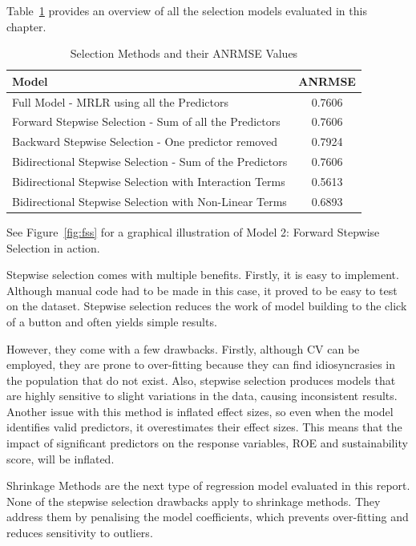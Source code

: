 \documentclass[11pt]{report} %
\begin{document}
\noindent Table~\ref{tab:model_anrmse} provides an overview of all the selection models evaluated in this chapter.
\renewcommand{\arraystretch}{1.1} %
\begin{table}[H]
    \centering
    \begin{tabular}{|l|c|}
        \hline
        \textbf{Model} & \textbf{ANRMSE} \\
        \hline
        Full Model - MRLR using all the Predictors & 0.7606  \\
        Forward Stepwise Selection - Sum of all the Predictors & 0.7606 \\
        Backward Stepwise Selection - One predictor removed & 0.7924 \\
        Bidirectional Stepwise Selection - Sum of the Predictors & 0.7606 \\
        Bidirectional Stepwise Selection with Interaction Terms & 0.5613 \\
        Bidirectional Stepwise Selection with Non-Linear Terms & 0.6893 \\
        \hline
    \end{tabular}
    \caption{Selection Methods and their ANRMSE Values}
    \label{tab:model_anrmse}
\end{table}
\noindent See Figure~\ref{fig:fss} for a graphical illustration of Model 2: Forward Stepwise Selection in action.

Stepwise selection comes with multiple benefits. Firstly, it is easy to implement. Although manual code had to be made in this case, it proved to be easy to test on the dataset. Stepwise selection reduces the work of model building to the click of a button and often yields simple results.\cite{Sainaniadv} 

However, they come with a few drawbacks. Firstly, although CV can be employed, they are prone to over-fitting because they can find idiosyncrasies in the population that do not exist.\cite{Sainaniadv} Also, stepwise selection produces models that are highly sensitive to slight variations in the data, causing inconsistent results. Another issue with this method is inflated effect sizes, so even when the model identifies valid predictors, it overestimates their effect sizes.\cite{Sainaniadv} This means that the impact of significant predictors on the response variables, ROE and sustainability score, will be inflated.

Shrinkage Methods are the next type of regression model evaluated in this report. None of the stepwise selection drawbacks apply to shrinkage methods. They address them by penalising the model coefficients, which prevents over-fitting and reduces sensitivity to outliers.
\end{document}
